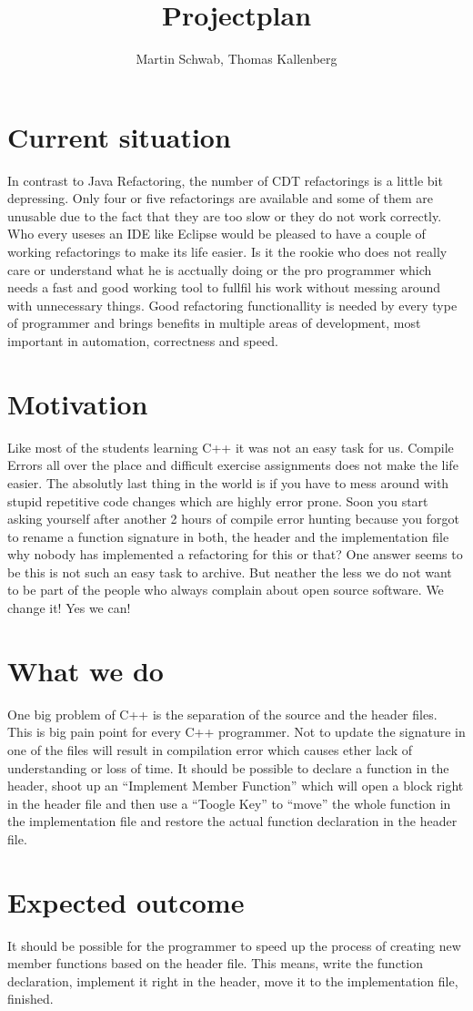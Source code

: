 \documentclass[a4paper,10pt]{scrreprt}
\title{Projectplan}
\author{Martin Schwab, Thomas Kallenberg}
\begin{document}
\maketitle

\section{Current situation}

In contrast to Java Refactoring, the number of CDT refactorings is a little bit depressing. Only four or five refactorings are available and some of them are unusable due to the fact that they are too slow or they do not work correctly.\newline
Who every useses an IDE like Eclipse would be pleased to have a couple of working refactorings to make its life easier. Is it the rookie who does not really care or understand what he is acctually doing or the pro programmer which needs a fast and good working tool to fullfil his work without messing around with unnecessary things. Good refactoring functionallity is needed by every type of programmer and brings benefits in multiple areas of development, most important in automation, correctness and speed.

\section{Motivation}

Like most of the students learning C++ it was not an easy task for us. Compile Errors all over the place and difficult exercise assignments does not make the life easier. The absolutly last thing in the world is if you have to mess around with stupid repetitive code changes which are highly error prone.\newline
Soon you start asking yourself after another 2 hours of compile error hunting because you forgot to rename a function signature in both, the header and the implementation file why nobody has implemented a refactoring for this or that?\newline
One answer seems to be this is not such an easy task to archive. But neather the less we do not want to be part of the people who always complain about open source software. We change it! Yes we can!

\section{What we do}

One big problem of C++ is the separation of the source and the header files. This is big pain point for every C++ programmer. Not to update the signature in one of the files will result in compilation error which causes ether lack of understanding or loss of time. It should be possible to declare a function in the header, shoot up an ``Implement Member Function'' which will open a block right in the header file and then use a ``Toogle Key'' to ``move'' the whole function in the implementation file and restore the actual function declaration in the header file.

\section{Expected outcome}

It should be possible for the programmer to speed up the process of creating new member functions based on the header file. This means, write the function declaration, implement it right in the header, move it to the implementation file, finished.
\end{document}
